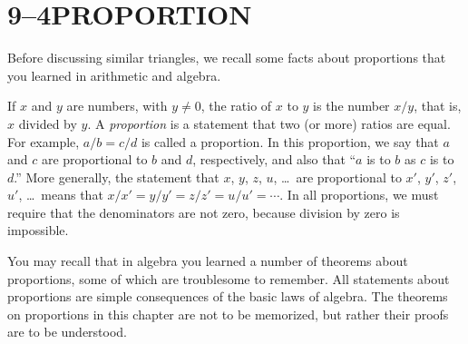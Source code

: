 \documentclass[11pt]{book}
\begin{document}
\section*{9--4\quad PROPORTION}

Before discussing similar triangles, we recall some facts about proportions that
you learned in arithmetic and algebra.

\begin{definition}
If $x$ and $y$ are numbers, with $y \neq 0$, the ratio of $x$ to $y$ is the
number $x/y$, that is, $x$ divided by $y$. A \emph{proportion} is a statement
that two (or more) ratios are equal. For example, $a/b = c/d$ is called a
proportion. In this proportion, we say that $a$ and $c$ are proportional to $b$
and $d$, respectively, and also that ``$a$ is to $b$ as $c$ is to $d$.'' More
generally, the statement that $x$, $y$, $z$, $u$, \dots\ are proportional to
$x'$, $y'$, $z'$, $u'$, \dots\ means that $x/x' = y/y' = z/z' = u/u' = \cdots$.
In all proportions, we must require that the denominators are not zero, because
division by zero is impossible.
\end{definition}

You may recall that in algebra you learned a number of theorems about
proportions, some of which are troublesome to remember. All statements about
proportions are simple consequences of the basic laws of algebra. The theorems on
proportions in this chapter are not to be memorized, but rather their proofs are
to be understood.
\end{document}
